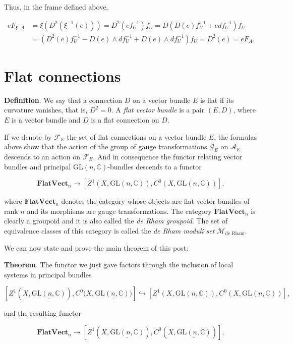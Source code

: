 \documentclass[]{article}
\begin{document}
Thus, in the frame defined above,

\begin{align*}
e F_{\xi \cdot A} &= \xi(D^2(\xi^{-1}(e))) = D^2(e f_U^{-1}) f_U = D(D(e) f_U^{-1} + e df_U^{-1}) f_U \\
&= (D^2(e) f_U^{-1} - D(e) \wedge df_U^{-1} + D(e) \wedge df_U^{-1} ) f_U =  D^2(e) = e F_A.
\end{align*}

\section{Flat connections}\label{flat-connections}

\textbf{Definition}. We say that a connection \(D\) on a vector bundle
\(E\) is flat if its curvature vanishes, that is, \(D^2=0\). A
\emph{flat vector bundle} is a pair \((E,D)\), where \(E\) is a vector
bundle and \(D\) is a flat connection on \(D\).

If we denote by \(\mathcal{F}_E\) the set of flat connections on a
vector bundle \(E\), the formulas above show that the action of the
group of gauge transformations \(\mathcal{G}_E\) on \(\mathcal{A}_E\)
descends to an action on \(\mathcal{F}_E\). And in consequence the
functor relating vector bundles and principal
\(\mathrm{GL}(n,\mathbb{C})\)-bundles descends to a functor

\[
\mathbf{FlatVect}_n \longrightarrow [Z^1(X,\mathrm{GL}(n,\mathbb{C})), C^0(X,\mathrm{GL}(n,\mathbb{C}))],
\]

where \(\mathbf{FlatVect}_n\) denotes the category whose objects are
flat vector bundles of rank \(n\) and its morphisms are gauge
transformations. The category \(\mathbf{FlatVect}_n\) is clearly a
groupoid and it is also called the \emph{de Rham groupoid}. The set of
equivalence classes of this category is called the \emph{de Rham moduli
set} \(\mathcal{M}_{\text{de Rham}}\).

We can now state and prove the main theorem of this post:

\textbf{Theorem}. The functor we just gave factors through the inclusion
of local systems in principal bundles

\[
[Z^1(X,\underline{\mathrm{GL}(n,\mathbb{C})}), C^0(X,\underline{\mathrm{GL}(n,\mathbb{C}))}] \hookrightarrow [Z^1(X,\mathrm{GL}(n,\mathbb{C})), C^0(X,\mathrm{GL}(n,\mathbb{C}))],
\]

and the resulting functor

\[
\mathbf{FlatVect}_n \longrightarrow [Z^1(X,\underline{\mathrm{GL}(n,\mathbb{C})}), C^0(X,\underline{\mathrm{GL}(n,\mathbb{C})})],
\]
\end{document}
